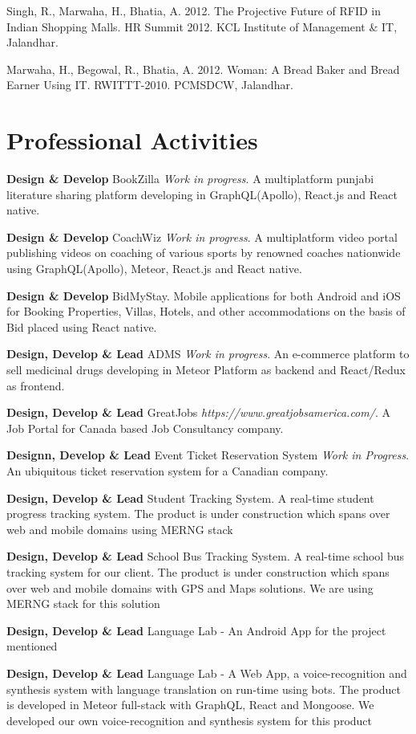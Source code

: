 \documentclass[margin,line]{res}
\begin{document}
\begin{resume}
Singh, R., Marwaha, H., Bhatia, A. 2012. The Projective Future of RFID in Indian Shopping Malls. HR Summit 2012. KCL Institute of Management \& IT, Jalandhar. 

Marwaha, H., Begowal, R., Bhatia, A. 2012. Woman: A Bread Baker and Bread Earner Using IT. RWITTT-2010. PCMSDCW, Jalandhar.

\section{\sc Professional Activities}

\textbf{Design \& Develop} BookZilla {\em Work in progress}. A multiplatform punjabi literature sharing platform developing in GraphQL(Apollo), React.js and React native.

\textbf{Design \& Develop} CoachWiz {\em Work in progress}. A multiplatform video portal publishing videos on coaching of various sports by renowned coaches nationwide using GraphQL(Apollo), Meteor, React.js and React native. 

\textbf{Design \& Develop} BidMyStay. Mobile applications for both Android and iOS for Booking Properties, Villas, Hotels, and other accommodations on the basis of Bid placed using React native.

\textbf{Design, Develop \& Lead} ADMS {\em Work in progress}. An e-commerce platform to sell medicinal drugs developing in Meteor Platform as backend and React/Redux as frontend.

\textbf{Design, Develop \& Lead} GreatJobs {\em https://www.greatjobsamerica.com/}. A Job Portal for Canada based Job Consultancy company.

\textbf{Designn, Develop \& Lead} Event Ticket Reservation System {\em Work in Progress}. An ubiquitous ticket reservation system for a Canadian company. 

\textbf{Design, Develop \& Lead} Student Tracking System. A real-time student progress tracking system. The product is under construction which spans over web and mobile domains using MERNG stack

\textbf{Design, Develop \& Lead} School Bus Tracking System. A real-time school bus tracking system for our client. The product is under construction which spans over web and mobile domains with GPS and Maps solutions. We are using MERNG stack for this solution

\textbf{Design, Develop \& Lead} Language Lab - An Android App for the project mentioned

\textbf{Design, Develop \& Lead} Language Lab - A Web App, a voice-recognition and synthesis system with language translation on run-time using bots. The product is developed in Meteor full-stack with GraphQL, React and Mongoose. We developed our own voice-recognition and synthesis system for this product


\end{resume}
\end{document}
